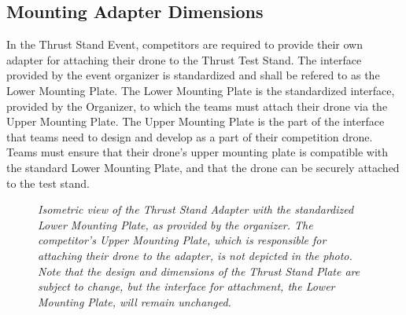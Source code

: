 \documentclass{article}
\begin{document}
\subsection{Mounting Adapter Dimensions}
In the Thrust Stand Event, competitors are required to provide their own adapter for attaching their drone to the Thrust Test Stand. The interface provided by the event organizer is standardized and shall be refered to as the Lower Mounting Plate. The Lower Mounting Plate is the standardized interface, provided by the Organizer, to which the teams must attach their drone via the Upper Mounting Plate. The Upper Mounting Plate is the part of the interface that teams need to design and develop as a part of their competition drone. Teams must ensure that their drone's upper mounting plate is compatible with the standard Lower Mounting Plate, and that the drone can be securely attached to the test stand. 
\begin{figure}[h!]
  \centering
 \caption{\textit{Isometric view of the Thrust Stand Adapter with the standardized Lower Mounting Plate, as provided by the organizer. The competitor's Upper Mounting Plate, which is responsible for attaching their drone to the adapter, is not depicted in the photo. Note that the design and dimensions of the Thrust Stand Plate are subject to change, but the interface for attachment, the Lower Mounting Plate, will remain unchanged.}}
 \end{figure}
\end{document}
